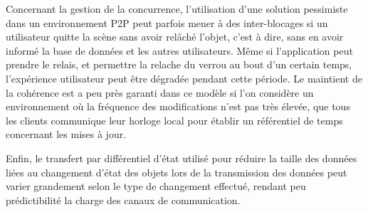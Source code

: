 Concernant la gestion de la concurrence, l'utilisation d'une solution pessimiste 
dans un environnement \gls{P2P} peut parfois mener à des inter-blocages si un 
utilisateur quitte la scène sans avoir relâché l'objet, c'est à dire, sans en avoir 
informé la base de données et les autres 
utilisateurs. 
Même si l'application peut prendre le relais, et permettre la relache du 
verrou au bout d'un certain temps, l'expérience utilisateur peut être dégradée 
pendant cette période.
Le maintient de la cohérence est a peu près garanti dans ce modèle si l'on 
considère un environnement où la fréquence des modifications n'est pas très 
élevée, que tous les clients communique leur horloge local pour établir un 
référentiel de temps concernant les mises à jour. 

Enfin, le transfert par différentiel d'état utilisé pour réduire la taille des 
données liées au changement d'état des objets lors de la transmission des 
données peut varier grandement selon le type de changement 
effectué, rendant peu prédictibilité la charge des canaux de communication. 
%
